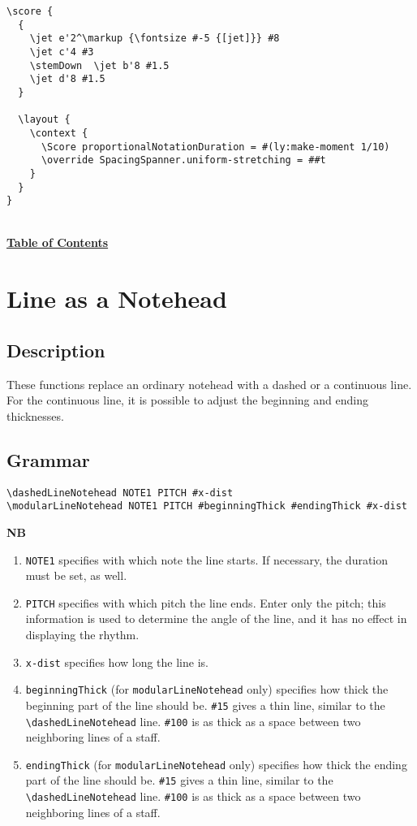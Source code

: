 \begin{verbatim}
\score {
  {
    \jet e'2^\markup {\fontsize #-5 {[jet]}} #8
    \jet c'4 #3
    \stemDown  \jet b'8 #1.5
    \jet d'8 #1.5
  }

  \layout {
    \context {
      \Score proportionalNotationDuration = #(ly:make-moment 1/10)    
      \override SpacingSpanner.uniform-stretching = ##t
    }
  }
}
\end{verbatim}
\hyperref[sec:toc]{\\ \textbf{Table of Contents}}

\vfill \break




\section {Line as a Notehead}
\label{sec:line_notehead}
\hfill

\subsection{Description}
These functions replace an ordinary notehead with a dashed or a continuous line. For the continuous line, it is possible to adjust the beginning and ending thicknesses.
\subsection{Grammar}
\begin{verbatim}
\dashedLineNotehead NOTE1 PITCH #x-dist
\modularLineNotehead NOTE1 PITCH #beginningThick #endingThick #x-dist
\end{verbatim}

\textbf{NB} 
\begin{enumerate} 
\item \verb|NOTE1| specifies with which note the line starts. If necessary, the duration must be set, as well.
\item \verb|PITCH| specifies with which pitch the line ends. Enter only the pitch; this information is used to determine the angle of the line, and it has no effect in displaying the rhythm.  
\item \verb|x-dist| specifies how long the line is.  
\item \verb|beginningThick| (for \verb|modularLineNotehead| only) specifies how thick the beginning part of the line should be. \verb|#15| gives a thin line, similar to the \verb|\dashedLineNotehead| line. \verb|#100| is as thick as a space between two neighboring lines of a staff.
\item \verb|endingThick| (for \verb|modularLineNotehead| only) specifies how thick the ending part of the line should be. \verb|#15| gives a thin line, similar to the \verb|\dashedLineNotehead| line. \verb|#100| is as thick as a space between two neighboring lines of a staff.
\end{enumerate}

